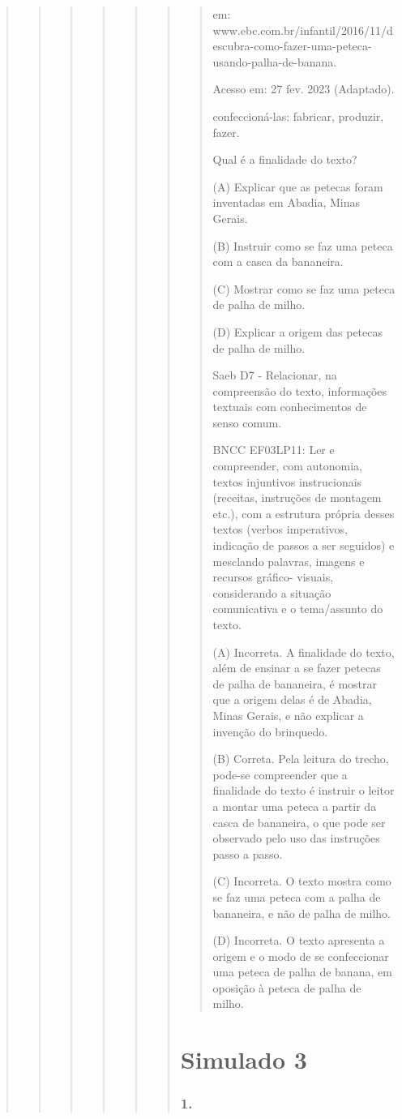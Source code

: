 \begin{quote}
\begin{quote}
\begin{quote}
\begin{quote}
\begin{quote}
\begin{quote}
\begin{quote}
em:
www.ebc.com.br/infantil/2016/11/descubra-como-fazer-uma-peteca-usando-palha-de-banana.

Acesso em: 27 fev. 2023 (Adaptado).

confeccioná-las: fabricar, produzir, fazer.

Qual é a finalidade do texto?

(A) Explicar que as petecas foram inventadas em Abadia, Minas Gerais.

(B) Instruir como se faz uma peteca com a casca da bananeira.

(C) Mostrar como se faz uma peteca de palha de milho.

(D) Explicar a origem das petecas de palha de milho.

Saeb D7 - Relacionar, na compreensão do texto, informações textuais com
conhecimentos de senso comum.

BNCC EF03LP11: Ler e compreender, com autonomia, textos injuntivos
instrucionais (receitas, instruções de montagem etc.), com a estrutura
própria desses textos (verbos imperativos, indicação de passos a ser
seguidos) e mesclando palavras, imagens e recursos gráfico- visuais,
considerando a situação comunicativa e o tema/assunto do texto.

(A) Incorreta. A finalidade do texto, além de ensinar a se fazer petecas
de palha de bananeira, é mostrar que a origem delas é de Abadia, Minas
Gerais, e não explicar a invenção do brinquedo.

(B) Correta. Pela leitura do trecho, pode-se compreender que a
finalidade do texto é instruir o leitor a montar uma peteca a partir da
casca de bananeira, o que pode ser observado pelo uso das instruções
passo a passo.

(C) Incorreta. O texto mostra como se faz uma peteca com a palha de
bananeira, e não de palha de milho.

(D) Incorreta. O texto apresenta a origem e o modo de se confeccionar
uma peteca de palha de banana, em oposição à peteca de palha de milho.
\end{quote}

\section{Simulado 3}\label{simulado-3}

\subsubsection{1. }\label{section-88}


\end{quote}
\end{quote}
\end{quote}
\end{quote}
\end{quote}
\end{quote}
